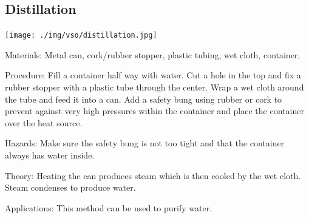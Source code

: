 \begin{multicols}{2}
\subsection{Distillation}

\begin{center}
\texttt{[image: ./img/vso/distillation.jpg]}
\end{center}

\begin{description*}
\item[Materials:]{Metal can, cork/rubber stopper, plastic tubing, wet cloth, container, }
\item[Procedure:]{Fill a container half way with water. Cut a hole in the top and fix a rubber stopper with a plastic tube through the center. Wrap a wet cloth around the tube and feed it into a can. Add a safety bung using rubber or cork to prevent against very high pressures within the container and place the container over the heat source.}
\item[Hazards:]{Make sure the safety bung is not too tight and that the container always has water inside.}
\item[Theory:]{Heating the can produces steam which is then cooled by the wet cloth. Steam condenses to produce water.}
\item[Applications:]{This method can be used to purify water.}
\end{description*}



\end{multicols}

\pagebreak